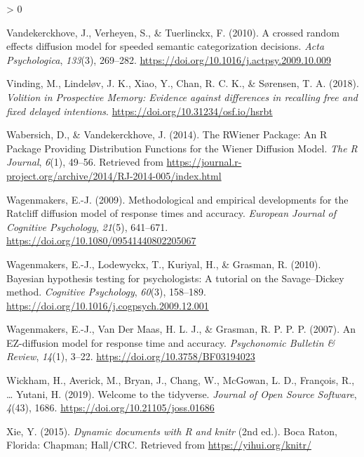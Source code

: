 \documentclass[
  11pt,
  english,
  ,doc,floatsintext]{apa6}
\newlength{\cslhangindent}
\newenvironment{CSLReferences}[2] %
 {%
  \setlength{\parindent}{0pt}
  \ifodd #1 \everypar{\setlength{\hangindent}{\cslhangindent}}\ignorespaces\fi
  \ifnum #2 > 0
  \setlength{\parskip}{#2\baselineskip}
  \fi
 }%
 {}
\begin{document}
\begin{CSLReferences}{1}{0}
\leavevmode\hypertarget{ref-vandekerckhove_crossed_2010}{}%
Vandekerckhove, J., Verheyen, S., \& Tuerlinckx, F. (2010). A crossed random effects diffusion model for speeded semantic categorization decisions. \emph{Acta Psychologica}, \emph{133}(3), 269--282. \url{https://doi.org/10.1016/j.actpsy.2009.10.009}

\leavevmode\hypertarget{ref-vinding_volition_2018}{}%
Vinding, M., Lindeløv, J. K., Xiao, Y., Chan, R. C. K., \& Sørensen, T. A. (2018). \emph{Volition in {Prospective} {Memory}: Evidence against differences in recalling free and fixed delayed intentions}. \url{https://doi.org/10.31234/osf.io/hsrbt}

\leavevmode\hypertarget{ref-wabersich_rwiener_2014}{}%
Wabersich, D., \& Vandekerckhove, J. (2014). The {RWiener} {Package}: An {R} {Package} {Providing} {Distribution} {Functions} for the {Wiener} {Diffusion} {Model}. \emph{The R Journal}, \emph{6}(1), 49--56. Retrieved from \url{https://journal.r-project.org/archive/2014/RJ-2014-005/index.html}

\leavevmode\hypertarget{ref-wagenmakers_methodological_2009-1}{}%
Wagenmakers, E.-J. (2009). Methodological and empirical developments for the {Ratcliff} diffusion model of response times and accuracy. \emph{European Journal of Cognitive Psychology}, \emph{21}(5), 641--671. \url{https://doi.org/10.1080/09541440802205067}

\leavevmode\hypertarget{ref-wagenmakers_bayesian_2010}{}%
Wagenmakers, E.-J., Lodewyckx, T., Kuriyal, H., \& Grasman, R. (2010). Bayesian hypothesis testing for psychologists: {A} tutorial on the {Savage}--{Dickey} method. \emph{Cognitive Psychology}, \emph{60}(3), 158--189. \url{https://doi.org/10.1016/j.cogpsych.2009.12.001}

\leavevmode\hypertarget{ref-wagenmakers_ez-diffusion_2007}{}%
Wagenmakers, E.-J., Van Der Maas, H. L. J., \& Grasman, R. P. P. P. (2007). An {EZ}-diffusion model for response time and accuracy. \emph{Psychonomic Bulletin \& Review}, \emph{14}(1), 3--22. \url{https://doi.org/10.3758/BF03194023}

\leavevmode\hypertarget{ref-R-tidyverse}{}%
Wickham, H., Averick, M., Bryan, J., Chang, W., McGowan, L. D., François, R., \ldots{} Yutani, H. (2019). Welcome to the {tidyverse}. \emph{Journal of Open Source Software}, \emph{4}(43), 1686. \url{https://doi.org/10.21105/joss.01686}

\leavevmode\hypertarget{ref-R-knitr}{}%
Xie, Y. (2015). \emph{Dynamic documents with {R} and knitr} (2nd ed.). Boca Raton, Florida: Chapman; Hall/CRC. Retrieved from \url{https://yihui.org/knitr/}

\end{CSLReferences}
\end{document}
